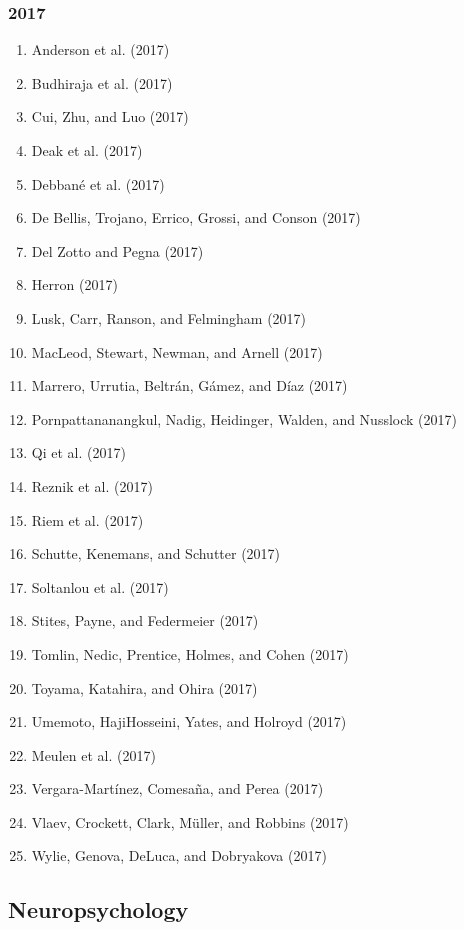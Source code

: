 \documentclass[english,man]{apa6}
\providecommand{\tightlist}{%
  \setlength{\itemsep}{0pt}\setlength{\parskip}{0pt}}
\begin{document}
\subsubsection{2017}\label{section-37}

\begin{enumerate}
\def\labelenumi{\arabic{enumi})}
\tightlist
\item
  Anderson et al. (2017)
\item
  Budhiraja et al. (2017)
\item
  Cui, Zhu, and Luo (2017)
\item
  Deak et al. (2017)
\item
  Debbané et al. (2017)
\item
  De Bellis, Trojano, Errico, Grossi, and Conson (2017)
\item
  Del Zotto and Pegna (2017)
\item
  Herron (2017)
\item
  Lusk, Carr, Ranson, and Felmingham (2017)
\item
  MacLeod, Stewart, Newman, and Arnell (2017)
\item
  Marrero, Urrutia, Beltrán, Gámez, and Díaz (2017)
\item
  Pornpattananangkul, Nadig, Heidinger, Walden, and Nusslock (2017)
\item
  Qi et al. (2017)
\item
  Reznik et al. (2017)
\item
  Riem et al. (2017)
\item
  Schutte, Kenemans, and Schutter (2017)
\item
  Soltanlou et al. (2017)
\item
  Stites, Payne, and Federmeier (2017)
\item
  Tomlin, Nedic, Prentice, Holmes, and Cohen (2017)
\item
  Toyama, Katahira, and Ohira (2017)
\item
  Umemoto, HajiHosseini, Yates, and Holroyd (2017)
\item
  Meulen et al. (2017)
\item
  Vergara-Martínez, Comesaña, and Perea (2017)
\item
  Vlaev, Crockett, Clark, Müller, and Robbins (2017)
\item
  Wylie, Genova, DeLuca, and Dobryakova (2017)
\end{enumerate}

\subsection{Neuropsychology}\label{neuropsychology}
\end{document}
